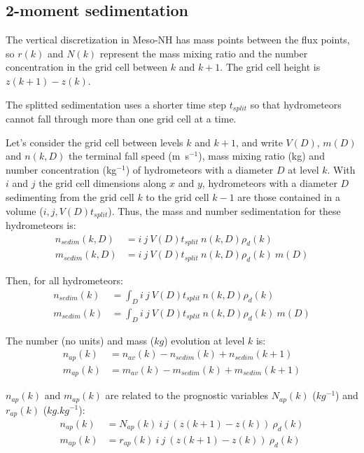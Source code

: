 {\subsection{2-moment sedimentation}

The vertical discretization in Meso-NH has mass points between the flux points, so $r(k)$ and $N(k)$ represent the mass mixing ratio and the number concentration in the grid cell between $k$ and $k+1$. The grid cell height is $z(k+1)-z(k)$. 

The splitted sedimentation uses a shorter time step $t_{split}$ so that hydrometeors cannot fall through more than one grid cell at a time.

Let's consider the grid cell between levels $k$ and $k+1$, and write $V(D)$, $m(D)$ and $n(k,D)$ the terminal fall speed (m~s$^{-1}$), mass mixing ratio (kg) and number concentration (kg$^{-1}$) of hydrometeors with a diameter $D$ at level $k$. With $i$ and $j$ the grid cell dimensions along $x$ and $y$, hydrometeors with a diameter $D$ sedimenting from the grid cell $k$ to the grid cell $k-1$ are those contained in a volume ($i, j, V(D)t_{split}$). Thus, the mass and number sedimentation for these hydrometeors is:
\begin{align}
 n_{sedim}(k,D) &= i~j~V(D)t_{split}~n(k,D)\rho_d(k)      \\
 m_{sedim}(k,D) &= i~j~V(D)t_{split}~n(k,D)\rho_d(k)~m(D)
\end{align}

Then, for all hydrometeors:
\begin{align}
 \label{sedim-n}
 n_{sedim}(k) &= \int_D i~j~V(D)t_{split}~n(k,D)\rho_d(k)      \\
 \label{sedim-m}
 m_{sedim}(k) &= \int_D i~j~V(D)t_{split}~n(k,D)\rho_d(k)~m(D)
\end{align}

The number (no units) and mass ($kg$) evolution at level $k$ is:
\begin{align}
 \label{bilan-n}
 n_{ap}(k) &= n_{av}(k) - n_{sedim}(k) + n_{sedim}(k+1)  \\
 \label{bilan-m}
 m_{ap}(k) &= m_{av}(k) - m_{sedim}(k) + m_{sedim}(k+1)
\end{align}

$n_{ap}(k)$ and $m_{ap}(k)$ are related to the prognostic variables $N_{ap}(k)$ ($kg^{-1}$) and $r_{ap}(k)$ ($kg.kg^{-1}$):
\begin{align}
 n_{ap}(k) &= N_{ap}(k) ~ i ~ j ~ (z(k+1)-z(k)) ~ \rho_d(k)  \\
 m_{ap}(k) &= r_{ap}(k) ~ i ~ j ~ (z(k+1)-z(k)) ~ \rho_d(k)
\end{align}

}
